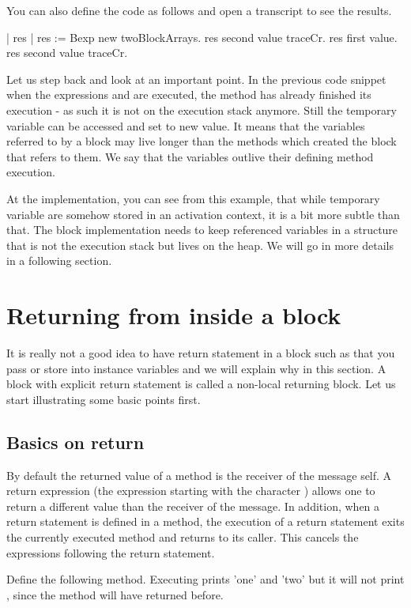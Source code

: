 \documentclass[a4paper,10pt,twoside]{book}
\begin{document}
You can also define the code as follows and open a transcript to see the results.

\begin{code}
| res |
res := Bexp new twoBlockArrays.
res second value traceCr.
res first value.
res second value traceCr.
\end{code}

Let us step back and look at an important point.
In the previous code snippet when the expressions  and  are executed, the method  has already finished its execution - as such it is not on the execution stack anymore.  Still the temporary variable  can be accessed and set to new value. It means that the variables referred to by a block may live longer than the methods which created the block that refers to them. We say that the variables outlive their defining method execution.

At the implementation, you can see from this example, that while temporary variable are somehow stored in an activation context, it is a bit more subtle than that. The block implementation needs to keep referenced variables in a structure that is not the execution stack but lives on the heap. We will go in more details in a following section.


\section{Returning from inside a block}
It is really not a good idea to have return statement in a block such as \ct{[^ 33]} that you pass or store into instance variables and we will explain why in this section. A block with explicit return statement is called a non-local returning block. Let us start illustrating some basic points first.

\subsection{Basics on return}
By default the returned value of a method is the receiver of the message \ie self.
A return expression (the expression starting with the character \ct{^}) allows one to return a different value than the receiver of the message. In addition, when a return statement is defined in a method, the execution of a return statement exits the currently executed method and returns to its caller. This cancels the expressions following the return statement.

Define the following method. Executing   prints 'one' and 'two' but it will not print , since the method  will have returned before.
\end{document}
